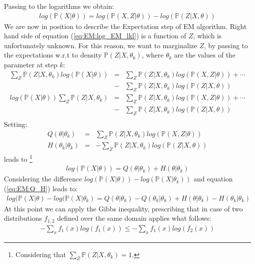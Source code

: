 \documentclass{article}
\begin{document}
Passing to the logarithms we obtain:
\begin{eqnarray}
log(\mathbb{P}(X|\theta)) = log(\mathbb{P}(X,Z|\theta)) - 
log(\mathbb{P}(Z|X,\theta)) 
\label{eq:EM:log_EM_lkl}
\end{eqnarray}
We are now in position to describe the Expectation step of EM algorithm. Right hand side of equation (\ref{eq:EM:log_EM_lkl}) is a function of $Z$, which is unfortunately unknown. For this reason, we want to marginalize $Z$, by passing to the expectations w.r.t to density $\mathbb{P}(Z|X,\theta _k)$, where  $\theta _k$ are the values of the parameter at step $k$:
\begin{eqnarray}
\sum_{Z} \mathbb{P}(Z|X,\theta_k) log(\mathbb{P}(X|\theta)) &=& \sum_{Z} \mathbb{P}(Z|X,\theta_k) log(\mathbb{P}(X,Z|\theta)) + \cdots \nonumber\\ 
&-& \sum_{Z} \mathbb{P}(Z|X,\theta_k) log(\mathbb{P}(Z|X,\theta))  \nonumber\\
log(\mathbb{P}(X|\theta)) \sum_{Z} \mathbb{P}(Z|X,\theta_k) &=& \sum_{Z} \mathbb{P}(Z|X,\theta_k) log(\mathbb{P}(X,Z|\theta)) + \cdots \nonumber\\ 
&-& \sum_{Z} \mathbb{P}(Z|X,\theta_k) log(\mathbb{P}(Z|X,\theta))  \nonumber\\
\end{eqnarray}
Setting:
\begin{eqnarray}
Q(\theta|\theta_k) &=& \sum_{Z} \mathbb{P}(Z|X,\theta_k) log(\mathbb{P}(X,Z|\theta)) \nonumber\\
H(\theta_k|\theta_k) &=& -\sum_{Z} \mathbb{P}(Z|X,\theta_k) log(\mathbb{P}(Z|X,\theta)) 
\end{eqnarray}
leads to \footnote{Considering that $\sum_{Z} \mathbb{P}(Z|X,\theta_k) = 1$.}
\begin{eqnarray}
log(\mathbb{P}(X|\theta)) = Q(\theta | \theta_k) + H(\theta | \theta_k)
\label{eq:EM:Q_H}
\end{eqnarray}
Considering the difference $log(\mathbb{P}(X|\theta)) - log(\mathbb{P}(X|\theta_k))$ and equation (\ref{eq:EM:Q_H}) leads to:
\begin{eqnarray}
log(\mathbb{P}(X|\theta) - log(\mathbb{P}(X|\theta_k) = 
Q(\theta|\theta_k) - Q(\theta_k|\theta_k) + 
H(\theta|\theta_k) - H(\theta_k|\theta_k)
\end{eqnarray}
At this point we can apply the Gibbs inequality,
prescribing that in case of two distributions $f_{1,2}$ defined over the same domain applies what follows:
\begin{eqnarray}
-\sum_{x} f_1(x)log(f_1(x)) \leq -\sum_{x} f_1(x)log(f_2(x)) 
\label{eq:EM:Gibbs_ineq}
\end{eqnarray}
\end{document}
